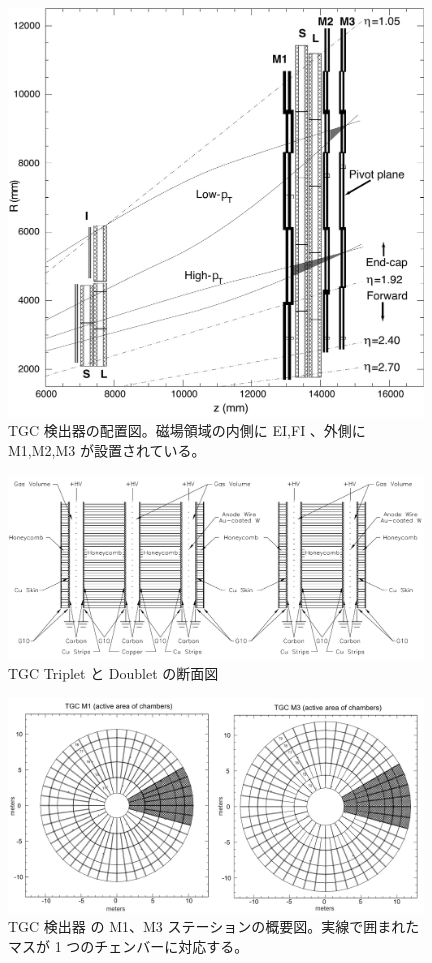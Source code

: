 \begin{figure}[tb]
  \centering
  \includegraphics[clip, width=11cm]{fig/2/l1mue-schema.pdf}
  \caption{TGC 検出器の配置図。磁場領域の内側に EI,FI 、外側に M1,M2,M3 が設置されている。}
  \label{fig:TGC_st}
\end{figure}

\begin{figure}[tb]
  \centering
  \includegraphics[clip, width=11cm]{fig/2/TGC_construction.pdf}
  \caption{TGC Triplet と Doublet の断面図}
  \label{fig:TGC}
\end{figure}

\begin{figure}[tb]
  \centering
  \includegraphics[clip, width=11cm]{fig/2/TGC_octant.png}
  \caption{TGC 検出器 の M1、M3 ステーションの概要図。実線で囲まれたマスが 1 つのチェンバーに対応する。}
  \label{fig:TGC_oc}
\end{figure}

